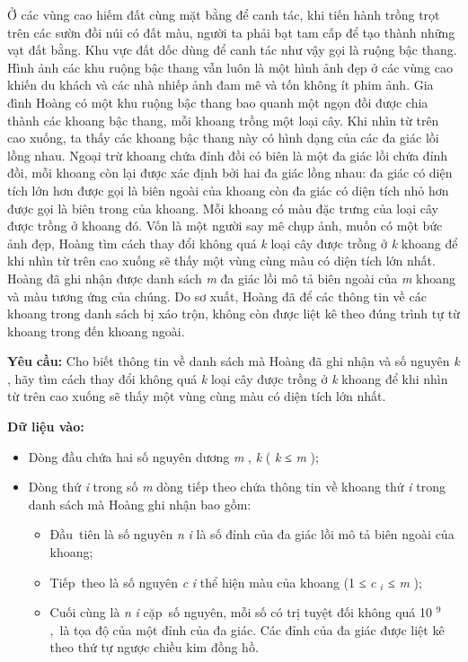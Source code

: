 

Ở các vùng cao hiếm đất cùng mặt bằng để canh tác, khi tiến hành trồng trọt trên các sườn đồi núi có đất màu, người ta phải bạt tam cấp để tạo thành những vạt đất bằng. Khu vực đất dốc dùng để canh tác như vậy gọi là ruộng bậc thang. Hình ảnh các khu ruộng bậc thang vẫn luôn là một hình ảnh đẹp ở các vùng cao khiến du khách và các nhà nhiếp ảnh đam mê và tốn không ít phim ảnh. Gia đình Hoàng có một khu ruộng bậc thang bao quanh một ngọn đồi được chia thành các khoang bậc thang, mỗi khoang trồng một loại cây. Khi nhìn từ trên cao xuống, ta thấy các khoang bậc thang này có hình dạng của các đa giác lồi lồng nhau. Ngoại trừ khoang chứa đỉnh đồi có biên là một đa giác lồi chứa đỉnh đồi, mỗi khoang còn lại được xác định bởi hai đa giác lồng nhau: đa giác có diện tích lớn hơn được gọi là biên ngoài của khoang còn đa giác có diện tích nhỏ hơn được gọi là biên trong của khoang. Mỗi khoang có màu đặc trưng của loại cây được trồng ở khoang đó. Vốn là một người say mê chụp ảnh, muốn có một bức ảnh đẹp, Hoàng tìm cách thay đổi không quá \emph{ k } loại cây được trồng ở \emph{ k } khoang để khi nhìn từ trên cao xuống sẽ thấy một vùng cùng màu có diện tích lớn nhất. Hoàng đã ghi nhận được danh sách \emph{ m } đa giác lồi mô tả biên ngoài của \emph{ m } khoang và màu tương ứng của chúng. Do sơ xuất, Hoàng đã để các thông tin về các khoang trong danh sách bị xáo trộn, không còn được liệt kê theo đúng trình tự từ khoang trong đến khoang ngoài.

\textbf{Yêu }\textbf{}\textbf{ cầu: }\textbf{} Cho biết thông tin về danh sách mà Hoàng đã ghi nhận và số nguyên \emph{ k } , hãy tìm cách thay đổi không quá \emph{ k } loại cây được trồng ở \emph{ k } khoang để khi nhìn từ trên cao xuống sẽ thấy một vùng cùng màu có diện tích lớn nhất.

\textbf{Dữ liệu vào: }
\begin{itemize}
	\item Dòng đầu chứa hai số nguyên dương \emph{ m } , \emph{ k } ( \emph{ k }\emph{} ≤ \emph{ m } );
	\item Dòng thứ \emph{ i } trong số \emph{ m } dòng tiếp theo chứa thông tin về khoang thứ \emph{ i } trong danh sách mà Hoàng ghi nhận bao gồm:
\begin{itemize}
	\item Đầu tiên là số nguyên \emph{ n }\emph{ i } là số đỉnh của đa giác lồi mô tả biên ngoài của khoang;
	\item Tiếp theo là số nguyên \emph{ c }\emph{ i }\emph{} thể hiện màu của khoang (1 ≤ \emph{ c }\emph{$_ i $}\emph{} ≤ \emph{ m } );
	\item Cuối cùng là \emph{ n }\emph{ i } cặp số nguyên, mỗi số có trị tuyệt đối không quá 10 $^ 9 $ , là tọa độ của một đỉnh của đa giác. Các đỉnh của đa giác được liệt kê theo thứ tự ngược chiều kim đồng hồ.
\end{itemize}
\end{itemize}

